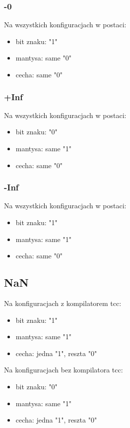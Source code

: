 \documentclass{article}
\begin{document}
\subsubsection{-0}

Na wszystkich konfiguracjach w postaci:
\begin{itemize}
\item bit znaku: "1"
\item mantysa: same "0"
\item cecha: same "0"
\end{itemize}

\subsubsection{+Inf}

Na wszystkich konfiguracjach w postaci:
\begin{itemize}
\item bit znaku: "0"
\item mantysa: same "1"
\item cecha: same "0"
\end{itemize}

\subsubsection{-Inf}

Na wszystkich konfiguracjach w postaci:
\begin{itemize}
\item bit znaku: "1"
\item mantysa: same "1"
\item cecha: same "0"
\end{itemize}

\subsection{NaN}

Na konfiguracjach z kompilatorem tcc:
\begin{itemize}
\item bit znaku: "1"
\item mantysa: same "1"
\item cecha: jedna "1", reszta "0"
\end{itemize}

Na konfiguracjach bez kompilatora tcc:
\begin{itemize}
\item bit znaku: "0"
\item mantysa: same "1"
\item cecha: jedna "1", reszta "0"
\end{itemize}
\end{document}

